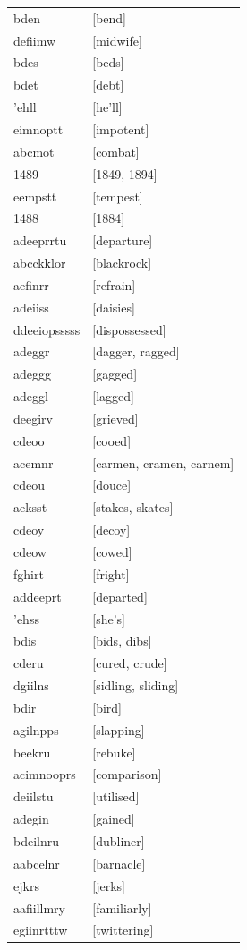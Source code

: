 \documentclass{article}
\begin{document}
\begin{tabular}{ll}
bden & [bend] \\
defiimw & [midwife] \\
bdes & [beds] \\
bdet & [debt] \\
'ehll & [he'll] \\
eimnoptt & [impotent] \\
abcmot & [combat] \\
1489 & [1849, 1894] \\
eempstt & [tempest] \\
1488 & [1884] \\
adeeprrtu & [departure] \\
abcckklor & [blackrock] \\
aefinrr & [refrain] \\
adeiiss & [daisies] \\
ddeeiopsssss & [dispossessed] \\
adeggr & [dagger, ragged] \\
adeggg & [gagged] \\
adeggl & [lagged] \\
deegirv & [grieved] \\
cdeoo & [cooed] \\
acemnr & [carmen, cramen, carnem] \\
cdeou & [douce] \\
aeksst & [stakes, skates] \\
cdeoy & [decoy] \\
cdeow & [cowed] \\
fghirt & [fright] \\
addeeprt & [departed] \\
'ehss & [she's] \\
bdis & [bids, dibs] \\
cderu & [cured, crude] \\
dgiilns & [sidling, sliding] \\
bdir & [bird] \\
agilnpps & [slapping] \\
beekru & [rebuke] \\
acimnooprs & [comparison] \\
deiilstu & [utilised] \\
adegin & [gained] \\
bdeilnru & [dubliner] \\
aabcelnr & [barnacle] \\
ejkrs & [jerks] \\
aafiillmry & [familiarly] \\
egiinrtttw & [twittering] \\

\end{tabular}
\end{document}
